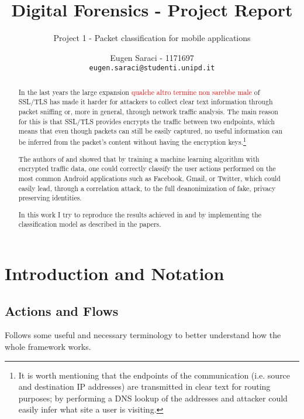 \documentclass[a4paper,10pt]{scrartcl}
\title{Digital Forensics - Project Report}
\subtitle{Project 1 - Packet classification for mobile applications}
\author{Eugen Saraci - 1171697\\ \texttt{eugen.saraci@studenti.unipd.it}}
\newcommand\todo[1]{\textcolor{red}{#1}}
\begin{document}
\maketitle

\begin{abstract}
 In the last years the large expansion \todo{qualche altro termine non sarebbe male} of SSL/TLS has made it harder for attackers to collect clear text information through packet sniffing or, more in general, through network traffic analysis. The main reason for this is that SSL/TLS provides encrypts the traffic between two endpoints, which means that even though packets can still be easily captured, no useful information can be inferred from the packet's content without having the encryption keys.\footnote{It is worth mentioning that the endpoints of the communication (i.e. source and destination IP addresses) are transmitted in clear text for routing purposes; by performing a DNS lookup of the addresses and attacker could easily infer what site a user is visiting.}

The authors of \cite{contiknocking} and \cite{contianalysis} showed that by training a machine learning algorithm with encrypted traffic data, one could correctly classify the user actions performed on the most common Android applications such as Facebook, Gmail, or Twitter, which could easily lead, through a correlation attack, to the full deanonimization of fake, privacy preserving identities.

In this work I try to reproduce the results achieved in \cite{contiknocking} and \cite{contianalysis} by implementing the classification model as described in the papers.
\vspace{0.5cm}
\end{abstract}

\section{Introduction and Notation}
\label{sec:intro}
\subsection{Actions and Flows}
\label{subsec:flows}
Follows some useful and necessary terminology to better understand how the whole framework works.
\end{document}
